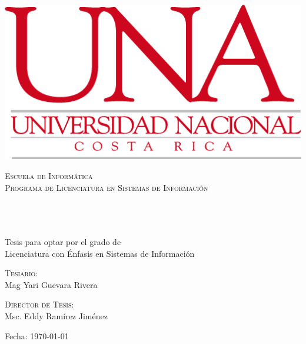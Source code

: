 \begin{titlepage}
	\begin{center}
		\includegraphics[scale=0.5]{images/logoUNA.png}
	\end{center}
	\begin{center}	
	\textcolor{unablue}{%
		\textsc{\LARGE Escuela de Inform\'{a}tica}
		\\[0.2cm]
		\textsc{\large Programa de Licenciatura en Sistemas de
		Informaci\'{o}n}
		\\
	}
	\vfill
	 
		
	\HRule 
	\\[0.9cm]
	\doublespacing
	{
		\large
		\bfseries
		\thesistitle
	}
	\\[0.4cm]
	\singlespacing
	\HRule 
	\\[1.4cm]

	{
		\large Tesis para optar por el grado de 
		\\[0.6cm]
		Licenciatura con \'{E}nfasis en Sistemas de
		Informaci\'{o}n
	}
	\\
	\vfill
	 
	\begin{minipage}{0.45\textwidth}
		\begin{flushleft} 
			\large
			\textsc{Tesiario:}\\
			{Mag Yari Guevara Rivera}
		\end{flushleft}
	\end{minipage}
	\begin{minipage}{0.50\textwidth}
		\begin{flushright} 
			\large
			\textsc{Director de Tesis:}\\
			{Msc. Eddy Ram\'{i}rez Jim\'{e}nez}
		\end{flushright}
	\end{minipage}

	\vfill
	
	{
		\large Fecha: \today
	}
	\end{center}
\end{titlepage}